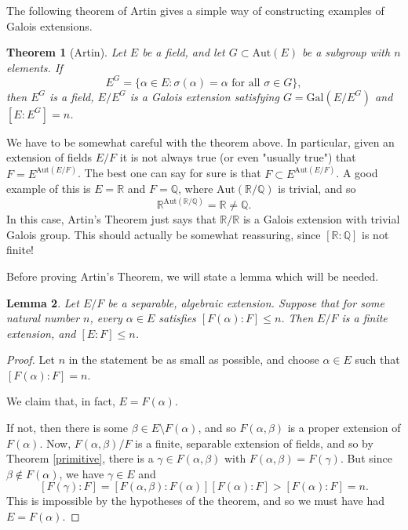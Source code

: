 \documentclass[12pt]{report}
\newtheorem{theorem}{Theorem}[section]
\newtheorem{lemma}[theorem]{Lemma}
\theoremstyle{definition}
\newcommand{\Aut}{\text{Aut}}
\newcommand{\Gal}{\text{Gal}}
\newcommand{\QQ}{\mathbb{Q}}
\newcommand{\RR}{\mathbb{R}}
\begin{document}
The following theorem of Artin gives a simple way of constructing examples
of Galois extensions.

\begin{theorem}[Artin]\label{artin}
	Let $E$ be a field, and let $G \subset \Aut(E)$ be a subgroup with $n$ elements. If $$E^G = \{ \alpha\in E : \sigma(\alpha) = \alpha \mbox{ for all } \sigma \in G\},$$ then $E^G$ is a field, $E/E^G$ is a Galois extension satisfying $G = \Gal(E/E^G)$ and $[E : E^G] = n$.
\end{theorem}

We have to be somewhat careful with the theorem above. In particular, given an extension of fields $E/F$ it is not always true (or even "usually true") that $F = E^{\Aut(E/F)}$. The best one can say for sure is that $F \subset E^{\Aut(E/F)}$. A good example of this is $E = \RR$ and $F = \QQ$, where $\Aut(\RR/\QQ)$ is trivial, and so $$\RR^{\Aut(\RR/\QQ)} = \RR \not= \QQ.$$
In this case, Artin's Theorem just says that $\RR/\RR$ is a Galois extension with trivial Galois group. This should actually be somewhat reassuring, since $[\RR : \QQ]$ is not finite!

Before proving Artin's Theorem, we will state a lemma which will be
needed.

\begin{lemma}
	Let $E/F$ be a separable, algebraic extension. Suppose that for some natural number $n$, every $\alpha \in E$ satisfies $[F(\alpha) : F] \leq n$. Then $E/F$ is a finite extension, and $[E : F] \leq n$.
\end{lemma}

\begin{proof}
	Let $n$ in the statement be as small as possible, and choose $\alpha \in E$ such that $[F(\alpha) : F] = n$.

	We claim that, in fact, $E = F(\alpha)$.

	If not, then there is some $\beta \in E\setminus F(\alpha)$, and so $F(\alpha,\beta)$ is a proper extension of $F(\alpha)$. Now, $F(\alpha,\beta)/F$ is a finite, separable extension of fields, and so by Theorem \ref{primitive}, there is a $\gamma \in F(\alpha,\beta)$ with $F(\alpha,\beta) = F(\gamma)$. But since $\beta \notin F(\alpha)$, we have $\gamma\in E$ and
	$$[F(\gamma) : F] = [F(\alpha,\beta) : F(\alpha)][F(\alpha) : F] > [F(\alpha) : F] = n.$$
	This is impossible by the hypotheses of the theorem, and so we must have had $E = F(\alpha)$.
\end{proof}
\end{document}
